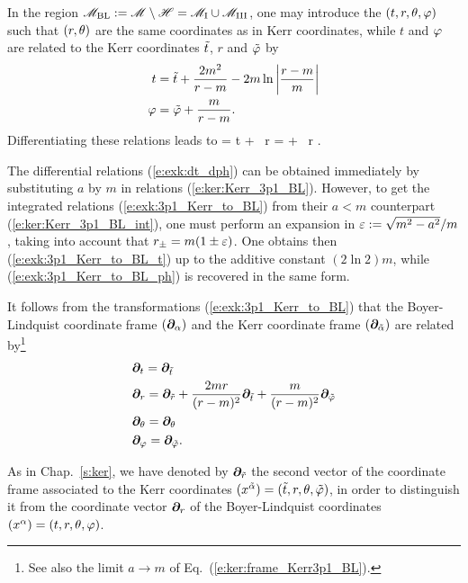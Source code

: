 In the region $\mathscr{M}_{\rm BL}:= \mathscr{M} \setminus \mathscr{H} = \mathscr{M}_{\rm I} \cup \mathscr{M}_{\rm III}$, one may introduce
the 
$(t,r,\theta,\varphi)$ such that $(r,\theta)$ are the same coordinates as in
Kerr coordinates, while $t$ and $\varphi$ are related to the Kerr coordinates
${\tilde t}$, $r$ and ${\tilde\varphi}$ by
\begin{subequations}
\label{e:exk:3p1_Kerr_to_BL}
\begin{align}
    t & = {\tilde t} +  \frac{2m^2}{r - m} - 2m \ln \left| \frac{r - m}{m} \right|
            \label{e:exk:3p1_Kerr_to_BL_t} \\
    \varphi & = {\tilde\varphi} + \frac{m}{r - m} . \label{e:exk:3p1_Kerr_to_BL_ph}
\end{align}
\end{subequations}
Differentiating these relations leads to
\be \label{e:exk:dt_dph}
    \D \ti = \D t  +  \, \D r
    \qand
    \D \tph = \D \ph +  \, \D r .
\ee
\begin{remark}
The differential relations (\ref{e:exk:dt_dph}) can be obtained immediately
by substituting $a$ by $m$ in relations (\ref{e:ker:Kerr_3p1_BL}). However, to get the integrated
relations (\ref{e:exk:3p1_Kerr_to_BL}) from their $a<m$ counterpart
(\ref{e:ker:Kerr_3p1_BL_int}), one must perform an expansion in $\varepsilon := \sqrt{m^2 - a^2}/m$,
taking into account that $r_\pm = m(1\pm\varepsilon)$. One obtains then
(\ref{e:exk:3p1_Kerr_to_BL_t})
up to the additive constant $(2\ln 2) m$, while (\ref{e:exk:3p1_Kerr_to_BL_ph}) is recovered in the same form.
\end{remark}
It follows from the transformations (\ref{e:exk:3p1_Kerr_to_BL}) that
the Boyer-Lindquist coordinate frame $(\bm{\partial}_\alpha)$ and the Kerr coordinate frame $(\bm{\partial}_{\tilde{\alpha}})$ are related by\footnote{See also the limit $a\to m$ of Eq.~(\ref{e:ker:frame_Kerr3p1_BL}).}
\begin{subequations}
\label{e:exk:frame_BL_Kerr3p1}
\begin{align}
    & \bm{\partial}_t  = \bm{\partial}_{\tilde t}  \\
    & \bm{\partial}_r = \bm{\partial}_{\tilde r} + \frac{2mr}{(r-m)^2} \bm{\partial}_{\tilde t}
                        + \frac{m}{(r-m)^2} \bm{\partial}_{\tilde\varphi} \\
    & \bm{\partial}_\theta = \bm{\partial}_\theta \\
    & \bm{\partial}_\varphi = \bm{\partial}_{{\tilde\varphi}} .
\end{align}
\end{subequations}

\begin{remark}
As in Chap.~\ref{s:ker}, we have denoted by $\bm{\partial}_{\tilde r}$ the second vector of the
coordinate frame associated to the Kerr coordinates
$(x^{\tilde{\alpha}}) = ({\tilde t}, r, \theta,{\tilde\varphi})$, in order to distinguish it from
the coordinate vector
$\bm{\partial}_r$ of the Boyer-Lindquist coordinates
$(x^\alpha) = (t,r,\theta,\varphi)$.
\end{remark}

